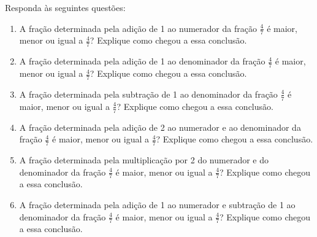 \begin{atividade}{}

Responda às seguintes questões:

\begin{enumerate} [\quad a)] %
  \item     A fração determinada pela adição de 1 ao numerador da fração     $\frac{4}{7}$ é maior, menor ou igual a     $\frac{4}{7}$? Explique como chegou a essa conclusão.
  \item     A fração determinada pela adição de 1 ao denominador da fração     $\frac{4}{7}$ é maior, menor ou igual a     $\frac{4}{7}$? Explique como chegou a essa conclusão.
  \item     A fração determinada pela subtração de 1 ao denominador da fração     $\frac{4}{7}$ é maior, menor ou igual a     $\frac{4}{7}$? Explique como chegou a essa conclusão.
  \item     A fração determinada pela adição de 2 ao numerador e ao denominador da fração     $\frac{4}{7}$ é maior, menor ou igual a     $\frac{4}{7}$? Explique como chegou a essa conclusão.
  \item     A fração determinada pela multiplicação por 2 do numerador e do denominador da fração     $\frac{4}{7}$ é maior, menor ou igual a     $\frac{4}{7}$? Explique como chegou a essa conclusão.
  \item     A fração determinada pela adição de 1 ao numerador e subtração de 1 ao denominador da fração     $\frac{4}{7}$ é maior, menor ou igual a     $\frac{4}{7}$? Explique como chegou a essa conclusão.
\end{enumerate} %

\end{atividade}

